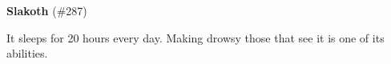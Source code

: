 \textbf{Slakoth} (\#287)

It sleeps for 20 hours every day. Making drowsy those that see it is one of its abilities.